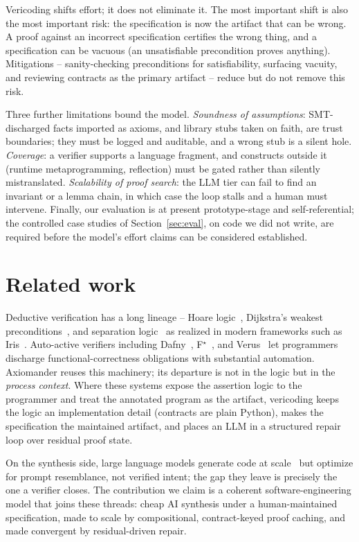 \documentclass[sigconf,nonacm]{acmart}
\begin{document}
Vericoding shifts effort; it does not eliminate it. The most important shift is
also the most important risk: the specification is now the artifact that can be
wrong. A proof against an incorrect specification certifies the wrong thing, and a
specification can be vacuous (an unsatisfiable precondition proves anything).
Mitigations -- sanity-checking preconditions for satisfiability, surfacing
vacuity, and reviewing contracts as the primary artifact -- reduce but do not
remove this risk.

Three further limitations bound the model. \emph{Soundness of assumptions}:
SMT-discharged facts imported as axioms, and library stubs taken on faith, are
trust boundaries; they must be logged and auditable, and a wrong stub is a silent
hole. \emph{Coverage}: a verifier supports a language fragment, and constructs
outside it (runtime metaprogramming, reflection) must be gated rather than
silently mistranslated. \emph{Scalability of proof search}: the LLM tier can fail
to find an invariant or a lemma chain, in which case the loop stalls and a human
must intervene. Finally, our evaluation is at present prototype-stage and
self-referential; the controlled case studies of Section~\ref{sec:eval}, on
code we did not write, are required before the model's effort claims can be
considered established.

\section{Related work}
\label{sec:related}

Deductive verification has a long lineage -- Hoare logic~\cite{hoare1969},
Dijkstra's weakest preconditions~\cite{dijkstra1975}, and separation
logic~\cite{reynolds2002} as realized in modern frameworks such as
Iris~\cite{jung2018iris}. Auto-active verifiers including
Dafny~\cite{leino2010dafny}, F$^\star$~\cite{swamy2016fstar}, and
Verus~\cite{lattuada2023verus} let programmers discharge functional-correctness
obligations with substantial automation. Axiomander reuses this machinery; its
departure is not in the logic but in the \emph{process context}. Where these
systems expose the assertion logic to the programmer and treat the annotated
program as the artifact, vericoding keeps the logic an implementation detail
(contracts are plain Python), makes the specification the maintained artifact,
and places an LLM in a structured repair loop over residual proof state.

On the synthesis side, large language models generate code at scale~\cite{chen2021codex}
but optimize for prompt resemblance, not verified intent; the gap they leave is
precisely the one a verifier closes. The contribution we claim is a coherent
software-engineering model that joins these threads: cheap AI synthesis under a
human-maintained specification, made to scale by compositional, contract-keyed
proof caching, and made convergent by residual-driven repair.
\end{document}
